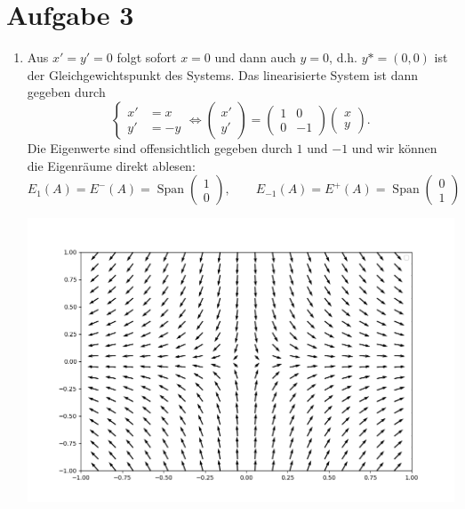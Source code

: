\documentclass{article}
\begin{document}
\section*{Aufgabe 3}
\begin{enumerate}
    \item 
    Aus $x' = y' = 0$ folgt sofort $x= 0$ und dann auch $y = 0$, d.h. $y* = (0,0)$ ist der Gleichgewichtspunkt des Systems.
    Das linearisierte System ist dann gegeben durch 
\[ 
    \begin{cases}
        x'&= x\\
        y'&= -y
    \end{cases} \Leftrightarrow \begin{pmatrix}
    x'\\y'
\end{pmatrix} = \begin{pmatrix}
    1 & 0\\0 &-1
\end{pmatrix} \begin{pmatrix}
    x\\y
\end{pmatrix}.
\]
Die Eigenwerte sind offensichtlich gegeben durch $1$ und $-1$ und wir können die Eigenräume direkt ablesen:
\[
    E_{1}(A) = E^-(A) = \operatorname{Span}  \begin{pmatrix}
    1\\0
\end{pmatrix}, \qquad E_{-1}(A) = E^+(A) = \operatorname{Span} \begin{pmatrix}
    0\\1
\end{pmatrix}
\]
\begin{center}
    \includegraphics[width = \textwidth]{figure_07_1.png}

\end{center}
\end{enumerate}
\end{document}
